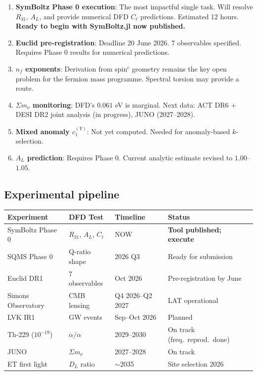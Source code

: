 \documentclass[11pt,a4paper]{article}
\begin{document}
\begin{enumerate}
\item \textbf{SymBoltz Phase 0 execution}: The most impactful single task. Will resolve $R_{31}$, $A_L$, and provide numerical DFD $C_\ell$ predictions. Estimated 12 hours. \textbf{Ready to begin with SymBoltz.jl now published.}

\item \textbf{Euclid pre-registration}: Deadline 20 June 2026. 7 observables specified. Requires Phase 0 results for numerical predictions.

\item \textbf{$n_f$ exponents}: Derivation from spin$^c$ geometry remains the key open problem for the fermion mass programme. Spectral torsion may provide a route.

\item \textbf{$\Sigma m_\nu$ monitoring}: DFD's $0.061$ eV is marginal. Next data: ACT DR6 + DESI DR2 joint analysis (in progress), JUNO (2027--2028).

\item \textbf{Mixed anomaly $c_1^{(Y)}$}: Not yet computed. Needed for anomaly-based $k$-selection.

\item \textbf{$A_L$ prediction}: Requires Phase 0. Current analytic estimate revised to $1.00$--$1.05$.
\end{enumerate}

\subsection{Experimental pipeline}

\begin{center}
\begin{tabular}{llll}
\toprule
\textbf{Experiment} & \textbf{DFD Test} & \textbf{Timeline} & \textbf{Status} \\
\midrule
SymBoltz Phase 0 & $R_{31}$, $A_L$, $C_\ell$ & NOW & \textbf{Tool published; execute} \\
SQMS Phase 0 & Q-ratio shape & 2026 Q3 & Ready for submission \\
Euclid DR1 & 7 observables & Oct 2026 & Pre-registration by June \\
Simons Observatory & CMB lensing & Q4 2026--Q2 2027 & LAT operational \\
LVK IR1 & GW events & Sep--Oct 2026 & Planned \\
Th-229 ($10^{-19}$) & $\dot{\alpha}/\alpha$ & 2029--2030 & On track (freq.\ reprod.\ done) \\
JUNO & $\Sigma m_\nu$ & 2027--2028 & On track \\
ET first light & $D_L$ ratio & $\sim$2035 & Site selection 2026 \\
\bottomrule
\end{tabular}
\end{center}
\end{document}
